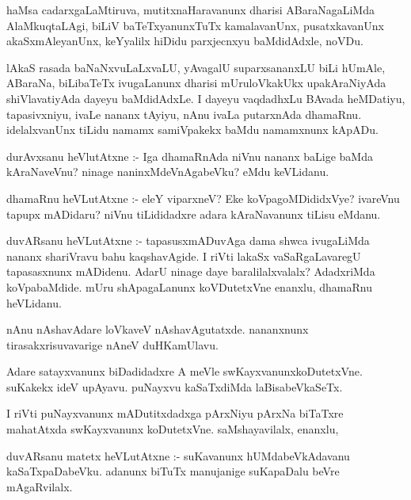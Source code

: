 \documentclass{article}
\begin{document}
\begin{mn}
haMsa cadarxgaLaMtiruva, mutitxnaHaravanunx dharisi ABaraNagaLiMda AlaMkuqtaLAgi,
 biLiV baTeTxyanunxTuTx kamalavanUnx, pusatxkavanUnx akaSxmAleyanUnx, keYyalilx 
 hiDidu parxjecnxyu baMdidAdxle, noVDu. 
\end{mn}

\begin{mn}
lAkaS rasada baNaNxvuLaLxvaLU, yAvagalU suparxsananxLU biLi hUmAle, ABaraNa,
 biLibaTeTx ivugaLanunx dharisi mUruloVkakUkx upakAraNiyAda shiVlavatiyAda dayeyu 
 baMdidAdxLe. I dayeyu vaqdadhxLu  BAvada heMDatiyu, tapasivxniyu,  ivaLe 
 nananx tAyiyu, nAnu ivaLa putarxnAda dhamaRnu.  idelalxvanUnx tiLidu namamx 
 samiVpakekx baMdu namamxnunx kApADu.
\end{mn}

\begin{mn}
durAvxsanu heVlutAtxne :- Iga dhamaRnAda niVnu nananx baLige baMda kAraNaveVnu?
 ninage naninxMdeVnAgabeVku? eMdu keVLidanu.
\end{mn}

\begin{mn}
dhamaRnu heVLutAtxne :- eleY viparxneV? Eke koVpagoMDididxVye? ivareVnu 
tapupx mADidaru? niVnu tiLididadxre adara kAraNavanunx tiLisu eMdanu.
\end{mn}

\begin{mn}
duvARsanu  heVLutAtxne :- tapasusxmADuvAga dama shwca ivugaLiMda nananx 
shariVravu  bahu kaqshavAgide. I riVti lakaSx vaSaRgaLavaregU tapasasxnunx
 mADidenu.  AdarU ninage daye baralilalxvalalx? AdadxriMda koVpabaMdide. 
 mUru shApagaLanunx koVDutetxVne enanxlu, dhamaRnu heVLidanu.
\end{mn}

\begin{mn}
nAnu nAshavAdare loVkaveV nAshavAgutatxde. nananxnunx tirasakxrisuvavarige nAneV duHKamUlavu.
\end{mn}

\begin{mn}
Adare satayxvanunx biDadidadxre A meVle swKayxvanunxkoDutetxVne. suKakekx 
ideV upAyavu. puNayxvu kaSaTxdiMda laBisabeVkaSeTx.
\end{mn}

\begin{mn}
I riVti puNayxvanunx mADutitxdadxga pArxNiyu pArxNa biTaTxre mahatAtxda 
swKayxvanunx koDutetxVne.  saMshayavilalx, enanxlu,
\end{mn}

\begin{mn}
duvARsanu matetx heVLutAtxne :- suKavanunx hUMdabeVkAdavanu kaSaTxpaDabeVku. 
adanunx biTuTx manujanige suKapaDalu beVre mAgaRvilalx.
\end{mn}
\end{document}
